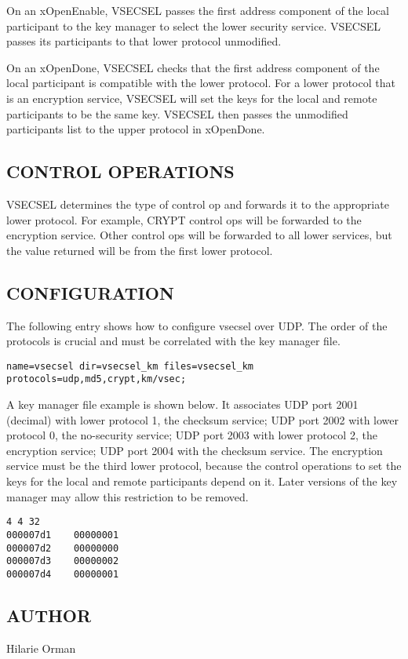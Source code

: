 On an xOpenEnable, VSECSEL passes the first address component of the local
participant to the key manager to select the lower security service.
VSECSEL passes its participants to that lower protocol unmodified.

On an xOpenDone, VSECSEL checks that the first address component of
the local participant is compatible with the lower protocol.  For
a lower protocol that is an encryption service, VSECSEL will set
the keys for the local and remote participants to be the same key.
VSECSEL then passes the unmodified participants list to the upper
protocol in xOpenDone.

\subsection*{CONTROL OPERATIONS}

VSECSEL determines the type of control op and forwards it to the
appropriate lower protocol.  For example, CRYPT control ops will be
forwarded to the encryption service.  Other control ops will be
forwarded to all lower services, but the value returned will be from
the first lower protocol.

\subsection*{CONFIGURATION}

The following entry shows how to configure vsecsel over UDP.  The
order of the protocols is crucial and must be correlated with the
key manager file.

\begin{verbatim}
name=vsecsel dir=vsecsel_km files=vsecsel_km protocols=udp,md5,crypt,km/vsec;
\end{verbatim}

A key manager file example is shown below.  It associates UDP port
2001 (decimal) with lower protocol 1, the checksum service; UDP port 2002
with lower protocol 0, the no-security service; UDP port 2003 with
lower protocol 2, the encryption service; UDP port 2004 with the
checksum service.  The encryption service must be the third lower
protocol, because the control operations to set the keys for the
local and remote participants depend on it.  Later versions of the
key manager may allow this restriction to be removed.

\begin{verbatim}
4 4 32
000007d1	00000001
000007d2	00000000
000007d3	00000002
000007d4	00000001
\end{verbatim}

\subsection*{AUTHOR}

\noindent Hilarie Orman
